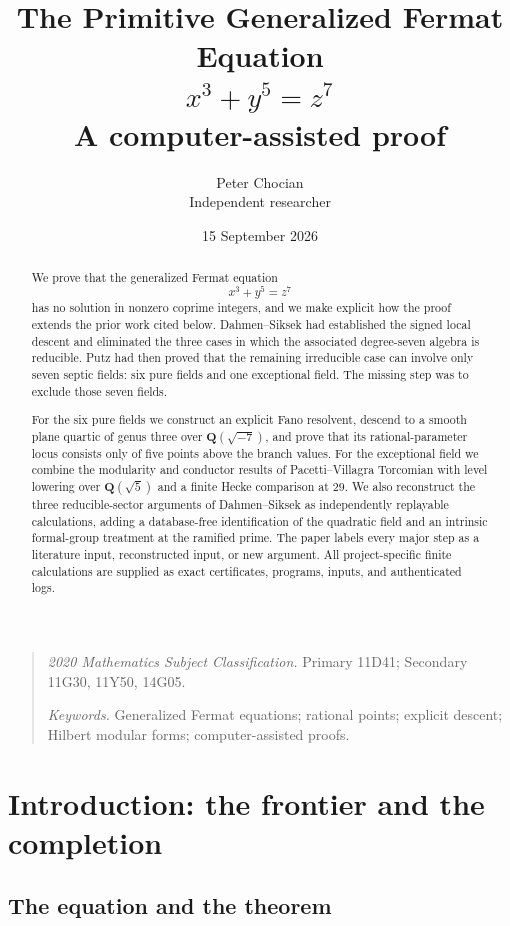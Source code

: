 \documentclass[11pt]{article}
\title{\textbf{The Primitive Generalized Fermat Equation}\\[1mm]
       $x^3+y^5=z^7$\\[3mm]
       \large A computer-assisted proof}
\author{Peter Chocian\\[1mm]\small Independent researcher}
\date{15 September 2026}
\newcommand{\Q}{\mathbf Q}
\theoremstyle{definition}
\theoremstyle{remark}
\begin{document}
\maketitle

\begin{abstract}
We prove that the generalized Fermat equation
\[
                         x^3+y^5=z^7
\]
has no solution in nonzero coprime integers, and we make explicit how the
proof extends the prior work cited below.  Dahmen--Siksek had
established the signed local descent and eliminated the three cases in which
the associated degree-seven algebra is reducible.  Putz had then proved that
the remaining irreducible case can involve only seven septic fields: six
pure fields and one exceptional field.  The missing step was to exclude
those seven fields.

For the six pure fields we construct an explicit Fano resolvent, descend to
a smooth plane quartic of genus three over $\Q(\sqrt{-7})$, and prove that
its rational-parameter locus consists only of five points above the branch
values.  For the
exceptional field we combine the modularity and conductor results of
Pacetti--Villagra Torcomian with level lowering over $\Q(\sqrt5)$ and a
finite Hecke comparison at $29$.  We also reconstruct the three reducible-sector arguments of Dahmen--Siksek as independently replayable calculations, adding
a database-free identification of the quadratic field and an intrinsic
formal-group treatment at the ramified prime.  The paper labels every major
step as a literature input, reconstructed input, or new argument.  All
project-specific finite calculations are supplied as exact certificates,
programs, inputs, and authenticated logs.
\end{abstract}

\begin{quote}\small
\textit{2020 Mathematics Subject Classification.}
Primary 11D41; Secondary 11G30, 11Y50, 14G05.\par
\textit{Keywords.} Generalized Fermat equations; rational points;
explicit descent; Hilbert modular forms; computer-assisted proofs.
\end{quote}

\tableofcontents

\section{Introduction: the frontier and the completion}

\subsection{The equation and the theorem}
\end{document}
